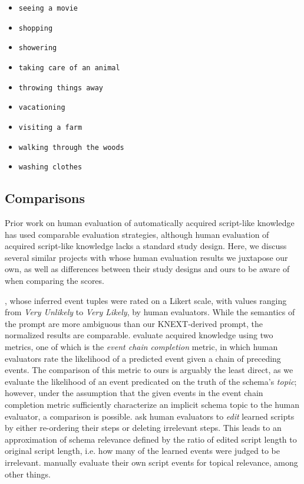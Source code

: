 {{\begin{multicols}{3}
\begin{itemize}
\item \texttt{seeing a movie}
\item \texttt{shopping}
\item \texttt{showering}
\item \texttt{taking care of an animal}
\item \texttt{throwing things away}
\item \texttt{vacationing}
\item \texttt{visiting a farm}
\item \texttt{walking through the woods}
\item \texttt{washing clothes}
\end{itemize}
\end{multicols}
}
}

\subsection{Comparisons}
\label{sec:comparison}
Prior work on human evaluation of automatically acquired script-like knowledge has used comparable evaluation strategies, although human evaluation of acquired script-like knowledge lacks a standard study design. Here, we discuss several similar projects with whose human evaluation results we juxtapose our own, as well as differences between their study designs and ours to be aware of when comparing the scores.

\citet{pichotta2016learning}, whose inferred event tuples were rated on a Likert scale, with values ranging from \textit{Very Unlikely} to \textit{Very Likely}, by human evaluators. While the semantics of the prompt are more ambiguous than our \textsc{KNEXT}-derived prompt, the normalized results are comparable. \citet{weber_causal_scripts} evaluate acquired knowledge using two metrics, one of which is the \textit{event chain completion} metric, in which human evaluators rate the likelihood of a predicted event given a chain of preceding events. The comparison of this metric to ours is arguably the least direct, as we evaluate the likelihood of an event predicated on the truth of the schema's \textit{topic}; however, under the assumption that the given events in the event chain completion metric sufficiently characterize an implicit schema topic to the human evaluator, a comparison is possible. \citet{goal-oriented-scripts} ask human evaluators to \textit{edit} learned scripts by either re-ordering their steps or deleting irrelevant steps. This leads to an approximation of schema relevance defined by the ratio of edited script length to original script length, i.e. how many of the learned events were judged to be irrelevant. \citet{starsem-scripts} manually evaluate their own script events for topical relevance, among other things.

